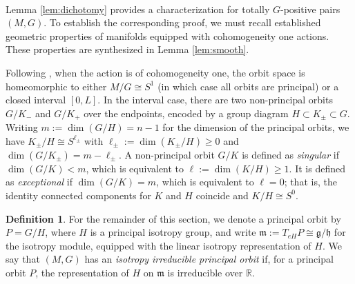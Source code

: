 \documentclass[12pt,a4paper]{amsart}
\theoremstyle{plain}
\theoremstyle{definition}
\newtheorem{definition}[theorem]{Definition}
\theoremstyle{remark}
\begin{document}
\ 

Lemma \ref{lem:dichotomy} provides a characterization for totally $G$-positive pairs $(M, G)$. To establish the corresponding proof, we must recall established geometric properties of manifolds equipped with cohomogeneity one actions. These properties are synthesized in Lemma \ref{lem:smooth}. 

Following \cites{Mostert, Bredon, alexandrino2015lie, GZ, Ziller}, when the action is of cohomogeneity one, the orbit space is homeomorphic to either $M/G \cong S^1$ (in which case all orbits are principal) or a closed interval $[0, L]$. In the interval case, there are two non-principal orbits $G/K_-$ and $G/K_+$ over the endpoints, encoded by a group diagram $H \subset K_\pm \subset G$. Writing $m := \dim(G/H) = n-1$ for the dimension of the principal orbits, we have $K_\pm/H \cong S^{\ell_\pm}$ with $\ell_\pm := \dim(K_\pm/H) \ge 0$ and $\dim(G/K_\pm) = m - \ell_\pm$. A non-principal orbit $G/K$ is defined as \emph{singular} if $\dim(G/K) < m$, which is equivalent to $\ell := \dim(K/H) \ge 1$. It is defined as \emph{exceptional} if $\dim(G/K) = m$, which is equivalent to $\ell = 0$; that is, the identity connected components for $K$ and $H$ coincide and $K/H \cong S^0$. 

\begin{definition}\label{def:isotropy-irreducible}
For the remainder of this section, we denote a principal orbit by $P = G/H$, where $H$ is a principal isotropy group, and write $\mathfrak{m} := T_{eH}P \cong \mathfrak{g}/\mathfrak{h}$ for the isotropy module, equipped with the linear isotropy representation of $H$. We say that $(M, G)$ has an \emph{isotropy irreducible principal orbit} if, for a principal orbit $P$, the representation of $H$ on $\mathfrak{m}$ is irreducible over $\mathbb{R}$. 
\end{definition}
\end{document}
